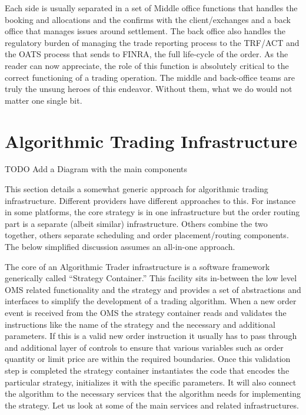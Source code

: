 Each side is usually separated in a set of Middle office functions that handles the booking and allocations and the confirms with the client/exchanges and a back office that manages issues around settlement.
The back office also handles the regulatory burden of  managing the trade reporting process to the TRF/ACT and the OATS process that sends to FINRA, the full life-cycle of the order. As the reader can now appreciate, the role of this function is absolutely critical to the correct functioning of a trading operation. The middle and back-office teams are truly the unsung heroes of this endeavor. Without them, what we do would not matter one single bit.



\section{Algorithmic Trading Infrastructure}

TODO Add a Diagram with the main components


This section details a somewhat generic approach for algorithmic trading infrastructure. Different providers have different approaches to this. For instance in some platforms, the core strategy is in one infrastructure but the order routing part is a separate (albeit similar) infrastructure. Others combine the two together, others separate scheduling and order placement/routing components. The below simplified discussion assumes an all-in-one approach.


The core of an Algorithmic Trader infrastructure is a software framework generically called ``Strategy Container.'' This facility sits in-between the low level OMS related functionality and the strategy and provides a set of abstractions and interfaces to simplify the development of a trading algorithm. When a new order event is received from the OMS the strategy container reads and validates the instructions like the name of the strategy and the necessary and additional parameters. If this is a valid new order instruction it usually has to pass through and additional layer of controls to ensure that various variables such as order quantity or limit price are within the required boundaries. Once this validation step is completed the strategy container instantiates the code that encodes the particular strategy, initializes it with the specific parameters. It will also connect the algorithm to the necessary services that the algorithm needs for implementing the strategy. Let us look at some of the main services and related infrastructures. \\


